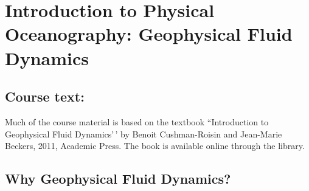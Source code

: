 \section{Introduction to Physical Oceanography: Geophysical Fluid
Dynamics}\label{introduction-to-physical-oceanography-geophysical-fluid-dynamics}

\subsection{Course text:}\label{course-text}

Much of the course material is based on the textbook ``Introduction to
Geophysical Fluid Dynamics'\,' by Benoit Cushman-Roisin and Jean-Marie
Beckers, 2011, Academic Press. The book is available online through the
library.

\subsection{Why Geophysical Fluid
Dynamics?}\label{why-geophysical-fluid-dynamics}


